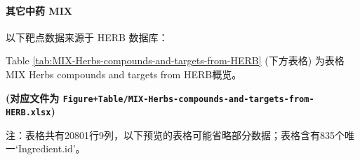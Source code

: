 \documentclass[
]{article}
\begin{document}
\hypertarget{ux5176ux5b83ux4e2dux836f-mix}{%
\paragraph{其它中药 MIX}\label{ux5176ux5b83ux4e2dux836f-mix}}

以下靶点数据来源于 HERB 数据库：

Table \ref{tab:MIX-Herbs-compounds-and-targets-from-HERB} (下方表格) 为表格MIX Herbs compounds and targets from HERB概览。

\textbf{(对应文件为 \texttt{Figure+Table/MIX-Herbs-compounds-and-targets-from-HERB.xlsx})}

\begin{center}\begin{tcolorbox}[colback=gray!10, colframe=gray!50, width=0.9\linewidth, arc=1mm, boxrule=0.5pt]注：表格共有20801行9列，以下预览的表格可能省略部分数据；表格含有835个唯一`Ingredient.id'。
\end{tcolorbox}
\end{center}
\end{document}
